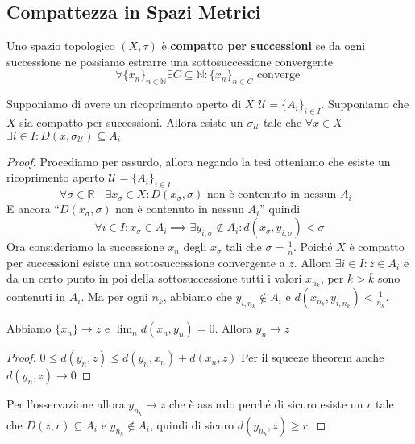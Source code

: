 \subsection{Compattezza in Spazi Metrici}
\begin{definition}
    Uno spazio topologico \((X, \tau)\) è \textbf{compatto per successioni} se
    da ogni successione ne possiamo estrarre una sottosuccessione convergente
    \[
        \forall \{x_{n}\}_{n \in \mathbb{N}} \exists C \subseteq \mathbb{N} :
        \{x_n\}_{n \in C} \text{ converge } 
    \]
\end{definition}
\begin{lemmao}\label{lebesgue_number}
    Supponiamo di avere un ricoprimento aperto di \(X\) \(\mathcal{U} = \{A_{i}\}_{i \in I}\).
    Supponiamo che \(X\) sia compatto per successioni. Allora esiste un
    \(\sigma_{\mathcal{U}}\) tale che \(\forall x \in X\) \(\exists i \in I:
    D(x, \sigma_{\mathcal{U}}) \subseteq A_{i} \) 
\end{lemmao}
\begin{proof}
    Procediamo per assurdo, allora negando la tesi otteniamo che esiste un
    ricoprimento aperto \(\mathcal{U} = \{A_{i}\}_{i \in I} \) 
    \[
        \forall \sigma \in \mathbb{R}^{+} \,\,\exists x_\sigma \in X : D(x_\sigma,
        \sigma)\text{ non è contenuto in nessun \(A_{i}\)  }
    \]
    E ancora ``\(D(x_\sigma, \sigma)\) non è contenuto in nessun \(A_{i}\)'' quindi
    \[
        \forall i \in I : x_\sigma \in A_{i} \implies \exists y_{i, \sigma}
        \not\in A_{i} : d(x_\sigma, y_{i, \sigma}) < \sigma
    \]
    Ora consideriamo la successione \(x_{n}\) degli \(x_\sigma\) tali che
    \(\sigma = \frac{1}{n}\). Poiché \(X\) è compatto per successioni esiste una
    sottosuccessione convergente a \(z\). Allora \(\exists i \in I:
    z\in A_{i}\) e da un certo punto in poi della sottosuccessione
    tutti i valori \(x_{n_k}\), per \(k > \overline{k}\) sono contenuti in
    \(A_{i}\). Ma per ogni \(n_k\), abbiamo che \(y_{i, n_k} \not\in A_{i}\) e
    \(d(x_{n_k}, y_{i, n_k}) < \frac{1}{n_k}\).
\begin{remark}
Abbiamo \(\{x_{n}\} \to z\) e \(\lim_{n}d(x_{n}, y_{n}) = 0\). Allora \(y_{n}
\to z\) 
\begin{proof}
    \(0 \le d(y_{n}, z) \le d(y_{n}, x_{n}) + d(x_{n}, z)\) Per il squeeze
    theorem anche \(d(y_{n}, z) \to 0\) 
\end{proof}
\end{remark}
    Per l'osservazione allora \(y_{n_k} \to z\) che è assurdo perché di sicuro
    esiste un \(r\) tale che \(D(z, r) \subseteq A_{i} \) e \(y_{n_k} \not\in
    A_{i}\), quindi di sicuro \(d(y_{n_k}, z)\ge r\).
\end{proof}
